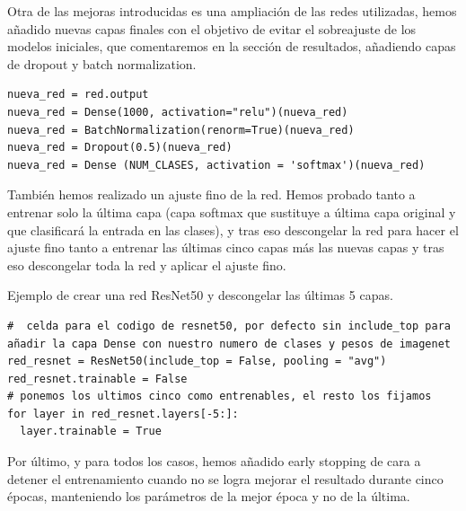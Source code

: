 Otra de las mejoras introducidas es una ampliación de las redes utilizadas, hemos añadido nuevas capas finales con el objetivo de evitar el sobreajuste de los modelos iniciales, que comentaremos en la sección de resultados, añadiendo capas de dropout y batch normalization.

\begin{lstlisting}
nueva_red = red.output
nueva_red = Dense(1000, activation="relu")(nueva_red)
nueva_red = BatchNormalization(renorm=True)(nueva_red)
nueva_red = Dropout(0.5)(nueva_red)
nueva_red = Dense (NUM_CLASES, activation = 'softmax')(nueva_red)
\end{lstlisting}

También hemos realizado un ajuste fino de la red. Hemos probado tanto a entrenar solo la última capa (capa softmax que sustituye a última capa original y que clasificará la entrada en las clases), y tras eso descongelar la red para hacer el ajuste fino tanto a entrenar las últimas cinco capas más las nuevas capas y tras eso descongelar toda la red y aplicar el ajuste fino.

Ejemplo de crear una red ResNet50 y descongelar las últimas 5 capas.

\begin{lstlisting}
#  celda para el codigo de resnet50, por defecto sin include_top para añadir la capa Dense con nuestro numero de clases y pesos de imagenet
red_resnet = ResNet50(include_top = False, pooling = "avg")
red_resnet.trainable = False
# ponemos los ultimos cinco como entrenables, el resto los fijamos
for layer in red_resnet.layers[-5:]:
  layer.trainable = True
\end{lstlisting}

Por último, y para todos los casos, hemos añadido early stopping de cara a detener el entrenamiento cuando no se logra mejorar el resultado durante cinco épocas, manteniendo los parámetros de la mejor época y no de la última.
